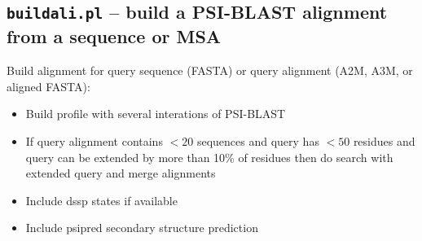 \documentclass[11pt,a4paper]{article}
\begin{document}
\subsection{{\tt buildali.pl} -- build a PSI-BLAST alignment from a sequence or MSA}

Build alignment for query sequence (FASTA) or query alignment (A2M, A3M, or aligned FASTA):
\begin{itemize}
\item{Build profile with several interations of PSI-BLAST} 
\item{If query alignment contains $<20$ sequences and query has $<50$ residues and query can be extended 
  by more than 10\% of residues then do search with extended query and merge alignments}
\item{Include dssp states if available}
\item{Include psipred secondary structure prediction  }
\end{itemize}
\end{document}
